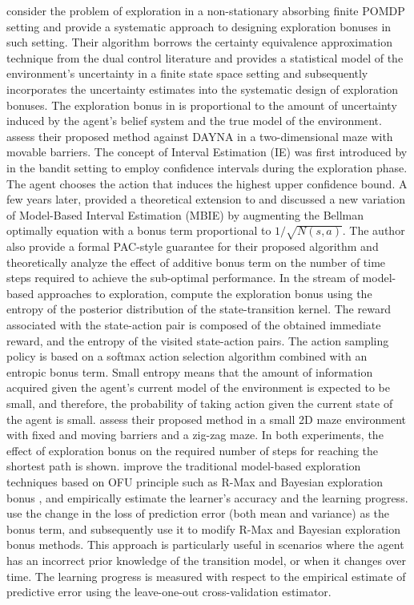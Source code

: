  consider the problem of exploration in a non-stationary absorbing finite POMDP setting and provide a systematic approach to designing exploration bonuses in such setting. Their algorithm borrows the certainty equivalence approximation technique from the dual control literature and provides a statistical model of the environment's uncertainty in a finite state space setting and subsequently incorporates the uncertainty estimates into the systematic design of exploration bonuses. The exploration bonus in  is proportional to the amount of uncertainty induced by the agent's belief system and the true model of the environment.  assess their proposed method against DAYNA  in a two-dimensional maze with movable barriers. 
The concept of Interval Estimation (IE) was first introduced by  in the bandit setting to employ confidence intervals during the exploration phase. The agent chooses the action that induces the highest upper confidence bound. A few years later,  provided a theoretical extension to  and discussed a new variation of Model-Based Interval Estimation (MBIE) by augmenting the Bellman optimally equation with a bonus term proportional to ${1}/{\sqrt{N(s,a)}}$. The author also provide a formal PAC-style guarantee for their proposed algorithm and theoretically analyze the effect of additive bonus term on the number of time steps required to achieve the sub-optimal performance. 
In the stream of model-based approaches to exploration,  compute the exploration bonus using the entropy of the posterior distribution of the state-transition kernel. The reward associated with the state-action pair is composed of the obtained immediate reward, and the entropy of the visited state-action pairs. The action sampling policy is based on a softmax action selection algorithm combined with an entropic bonus term. Small entropy means that the amount of information acquired given the agent's current model of the environment is expected to be small, and therefore, the probability of taking action given the current state of the agent is small.  assess their proposed method in a small 2D maze environment with fixed and moving barriers and a zig-zag maze. In both experiments, the effect of exploration bonus on the required number of steps for reaching the shortest path is shown.
 improve the traditional model-based exploration techniques based on OFU principle such as R-Max  and Bayesian exploration bonus , and empirically estimate the learner's accuracy and the learning progress.  use the change in the loss of prediction error (both mean and variance) as the bonus term, and subsequently use it to modify R-Max and Bayesian exploration bonus methods. This approach is particularly useful in scenarios where the agent has an incorrect prior knowledge of the transition model, or when it changes over time.  The learning progress is measured with respect to the empirical estimate of predictive error using the leave-one-out cross-validation estimator.

